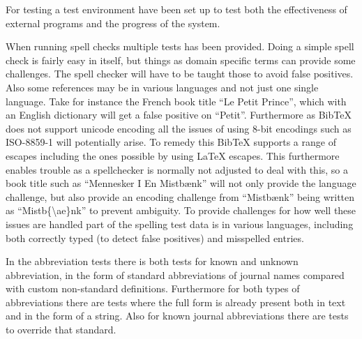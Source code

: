 For testing a test environment have been set up to test both the
effectiveness of external programs and the progress of the system.

When running spell checks multiple tests has been provided.  Doing a
simple spell check is fairly easy in itself, but things as domain
specific terms can provide some challenges.  The spell checker will
have to be taught those to avoid false positives.  Also some
references may be in various languages and not just one single
language.  Take for instance the French book title ``Le Petit
Prince'', which with an English dictionary will get a false positive
on ``Petit''.  Furthermore as Bib{\TeX} does not support unicode
encoding\cite{bibtex_encoding} all the issues of using 8-bit encodings
such as ISO-8859-1 will potentially arise.  To remedy this Bib{\TeX}
supports a range of escapes including the ones possible by using
{\LaTeX} escapes\cite{bibtex_resource}.  This furthermore enables
trouble as a spellchecker is normally not adjusted to deal with this,
so a book title such as ``Mennesker I En Mistbænk'' will not only
provide the language challenge, but also provide an encoding challenge
from ``Mistbænk'' being written as ``Mistb{\{}{\backslash}ae{\}}nk''
to prevent ambiguity.  To provide challenges for how well these issues
are handled part of the spelling test data is in various languages,
including both correctly typed (to detect false positives) and
misspelled entries.

In the abbreviation tests there is both tests for known and unknown
abbreviation, in the form of standard abbreviations of journal names
compared with custom non-standard definitions.  Furthermore for both
types of abbreviations there are tests where the full form is already
present both in text and in the form of a string.  Also for known
journal abbreviations there are tests to override that standard.


